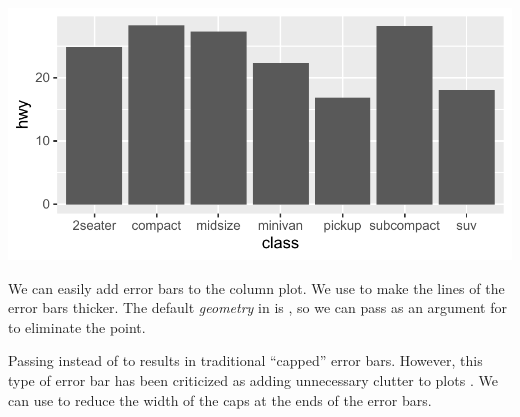 \documentclass[krantz2]{krantz}\usepackage{knitr}
\begin{document}
\begin{knitrout}\footnotesize
{}\color{fgcolor}\begin{kframe}
\begin{alltt}
  \hlopt{+}
  \hlstd{(} \hlstd{=} \hlstd{,}  
\end{alltt}
\end{kframe}

{\centering \includegraphics[width=.7\textwidth]{figure/pos-summary-plot-09a-1} 

}



\end{knitrout}

We can easily add error bars to the column plot. We use  to make the lines of the error bars thicker. The default \emph{geometry} in  is , so we can pass  as an argument for  to eliminate the point.

\begin{knitrout}\footnotesize
{}\color{fgcolor}\begin{kframe}
\begin{alltt}
  \hlstd{(} \hlstd{=} \hlstd{,}  \hlstd{=} \hlstd{,}
                \hlstd{=} \hlstd{,}  \hlstd{=} \hlstd{)}
\end{alltt}
\end{kframe}
\end{knitrout}

Passing  instead of  to  results in traditional ``capped'' error bars. However, this type of error bar has been criticized as adding unnecessary clutter to plots \autocite{Tufte1983}. We can use  to reduce the width of the caps at the ends of the error bars.
\end{document}
